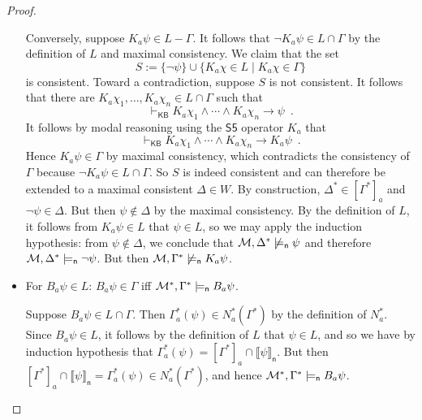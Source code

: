 \documentclass[12pt]{article}
\theoremstyle{definition}
\newcommand{\M}{{\cal M}}      %
\newcommand{\KB}{{\mathsf{KB}}}                     %
\newcommand{\modelsn}{\models_{\mathsf{n}}}                  %
\newcommand{\semn}[1]{\llbracket{#1}\rrbracket_{\mathsf{n}}} %
\begin{document}
\begin{proof}
\begin{itemize}
    Conversely, suppose $K_a\psi\in L-\Gamma$.  It follows that $\lnot
    K_a\psi\in L\cap\Gamma$ by the definition of $L$ and maximal
    consistency.  We claim that the set
    \[
    S:=\{\lnot\psi\}\cup\{K_a\chi\in L\mid K_a\chi\in\Gamma\}
    \]
    is consistent.  Toward a contradiction, suppose $S$ is not
    consistent.  It follows that there are
    $K_a\chi_1,\ldots,K_a\chi_n\in L\cap\Gamma$ such that
    \[
    \vdash_\KB K_a\chi_1\land\cdots\land K_a\chi_n\to \psi\enspace.
    \]
    It follows by modal reasoning using the $\mathsf{S5}$ operator
    $K_a$ that
    \[
    \vdash_\KB K_a\chi_1\land\cdots\land K_a\chi_n\to K_a\psi\enspace.
    \]
    Hence $K_a\psi\in\Gamma$ by maximal consistency, which contradicts
    the consistency of $\Gamma$ because $\lnot K_a\psi\in
    L\cap\Gamma$.  So $S$ is indeed consistent and can therefore be
    extended to a maximal consistent $\Delta\in W$.  By construction,
    $\Delta^*\in[\Gamma^*]_a$ and $\lnot\psi\in\Delta$. But then
    $\psi\notin\Delta$ by the maximal consistency. By the definition
    of $L$, it follows from $K_a\psi\in L$ that $\psi\in L$, so we may
    apply the induction hypothesis: from $\psi\notin\Delta$, we
    conclude that $\M,\Delta^*\not\modelsn\psi$ and therefore
    $\M,\Delta^*\modelsn\lnot\psi$.  But then $\M,\Gamma^*\not\modelsn
    K_a\psi$.
    
  \item For $B_a\psi\in L$: $B_a\psi\in\Gamma$ iff
    $\M^*,\Gamma^*\modelsn B_a\psi$.

    Suppose $B_a\psi\in L\cap\Gamma$. Then $\Gamma^*_a(\psi)\in
    N^*_a(\Gamma^*)$ by the definition of $N^*_a$.  Since $B_a\psi\in
    L$, it follows by the definition of $L$ that $\psi\in L$, and so
    we have by induction hypothesis that
    $\Gamma^*_a(\psi)=[\Gamma^*]_a\cap\semn{\psi}$.  But then
    $[\Gamma^*]_a\cap\semn{\psi}=\Gamma^*_a(\psi)\in N^*_a(\Gamma^*)$,
    and hence $\M^*,\Gamma^*\modelsn B_a\psi$.


\end{itemize}
\end{proof}
\end{document}
